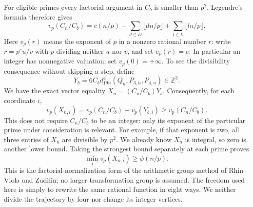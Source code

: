 \documentclass[11pt]{article}
\newcommand{\Z}{\mathbb Z}
\newcommand{\vp}{v_p}
\begin{document}
For eligible primes every factorial argument in $C_b$ is smaller than
$p^2$. Legendre's formula therefore gives
\[
 \vp(C_n/C_b)=c(n/p)-\sum_{d\in D}\lfloor dn/p\rfloor
                         +\sum_{l\in L}\lfloor ln/p\rfloor.
\]
Here $v_p(r)$ means the exponent of $p$ in a nonzero rational number $r$:
write $r=p^eu/v$ with $p$ dividing neither $u$ nor $v$, and set $v_p(r)=e$.
In particular an integer has nonnegative valuation; set $v_p(0)=+\infty$.
To see the divisibility consequence without skipping a step, define
\[
 Y_b=6C_b d_{19n}^4(Q_n,P_{3,n},P_{4,n})\in\Z^3.
\]
We have the exact vector equality $X_n=(C_n/C_b)Y_b$. Consequently,
for each coordinate $i$,
\[
 v_p(X_{n,i})=v_p(C_n/C_b)+v_p(Y_{b,i})\geq v_p(C_n/C_b).
\]
This does not require $C_n/C_b$ to be an integer: only its exponent of
the particular prime under consideration is relevant. For example,
if that exponent is two, all three entries of $X_n$ are divisible by $p^2$.
We already know $X_n$ is integral, so zero is another lower bound.
Taking the strongest bound separately at each prime proves
\begin{equation}\label{arith-pairbound}
 \min_i\vp(X_{n,i})\geq\phi(n/p).
\end{equation}
This is the factorial-normalization form of the arithmetic group method
of Rhin--Viola and Zudilin; no larger transformation group is assumed.
The freedom used here is simply to rewrite the same rational function
in eight ways. We neither divide the trajectory by four nor change its
integer vertices.
\end{document}
